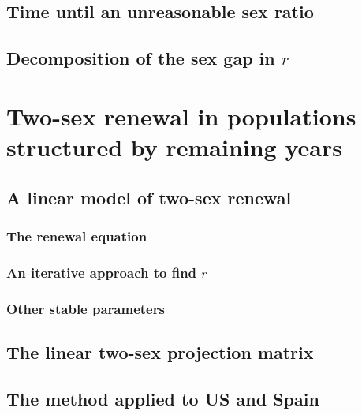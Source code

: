     \section{Time until an unreasonable sex ratio}
      
      
    \section{Decomposition of the sex gap in $r$}
      
\chapter{Two-sex renewal in populations structured by remaining years}
  
  
  \section{A linear model of two-sex renewal}
    
    
    \subsection{The renewal equation}
      
      
    \subsection{An iterative approach to find $r$}
        
        
    \subsection{Other stable parameters}
        
  
  \section{The linear two-sex projection matrix}
      
  
  \section{The method applied to US and Spain}
      
        
